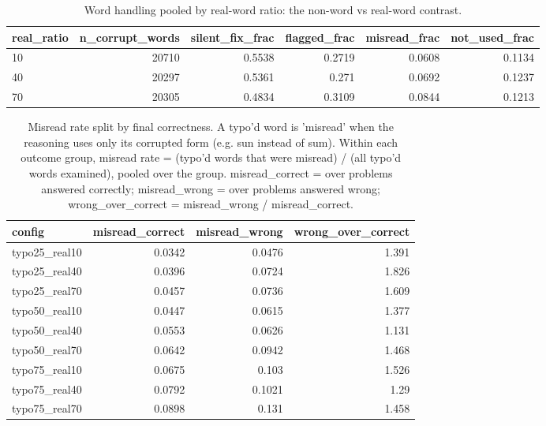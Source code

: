 \documentclass[11pt]{article}
\begin{document}
\begin{table}[H]
\centering
\caption{Word handling pooled by real-word ratio: the non-word vs real-word contrast.}
\small
\begin{adjustbox}{max width=\textwidth}
\begin{tabular}{lrrrrr}
\toprule
\textbf{real\_ratio} & \textbf{n\_corrupt\_words} & \textbf{silent\_fix\_frac} & \textbf{flagged\_frac} & \textbf{misread\_frac} & \textbf{not\_used\_frac} \\
\midrule
10 & 20710 & 0.5538 & 0.2719 & 0.0608 & 0.1134 \\
40 & 20297 & 0.5361 & 0.271 & 0.0692 & 0.1237 \\
70 & 20305 & 0.4834 & 0.3109 & 0.0844 & 0.1213 \\
\bottomrule
\end{tabular}
\end{adjustbox}
\end{table}

\begin{table}[H]
\centering
\caption{Misread rate split by final correctness. A typo'd word is 'misread' when the reasoning uses only its corrupted form (e.g. sun instead of sum). Within each outcome group, misread rate = (typo'd words that were misread) / (all typo'd words examined), pooled over the group. misread\_correct = over problems answered correctly; misread\_wrong = over problems answered wrong; wrong\_over\_correct = misread\_wrong / misread\_correct.}
\small
\begin{adjustbox}{max width=\textwidth}
\begin{tabular}{lrrr}
\toprule
\textbf{config} & \textbf{misread\_correct} & \textbf{misread\_wrong} & \textbf{wrong\_over\_correct} \\
\midrule
typo25\_real10 & 0.0342 & 0.0476 & 1.391 \\
typo25\_real40 & 0.0396 & 0.0724 & 1.826 \\
typo25\_real70 & 0.0457 & 0.0736 & 1.609 \\
typo50\_real10 & 0.0447 & 0.0615 & 1.377 \\
typo50\_real40 & 0.0553 & 0.0626 & 1.131 \\
typo50\_real70 & 0.0642 & 0.0942 & 1.468 \\
typo75\_real10 & 0.0675 & 0.103 & 1.526 \\
typo75\_real40 & 0.0792 & 0.1021 & 1.29 \\
typo75\_real70 & 0.0898 & 0.131 & 1.458 \\
\bottomrule
\end{tabular}
\end{adjustbox}
\end{table}
\end{document}

